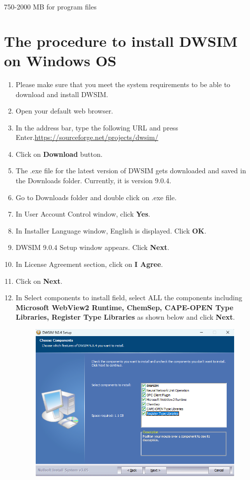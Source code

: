 \documentclass[a4paper,12pt]{article}
\begin{document}
750-2000 MB for program files

\section{The procedure to install DWSIM on Windows OS}

\begin{enumerate}
\item Please make sure that you meet the system requirements to be able to download and install DWSIM.
\item Open your default web browser.
\item In the address bar, type the following URL and press Enter.\newline \url{https://sourceforge.net/projects/dwsim/}
\item Click on \textbf{Download} button.
\item The .exe file for the latest version of DWSIM gets downloaded and saved in the Downloads folder. Currently, it is version 9.0.4.
\item Go to Downloads folder and double click on .exe file.
\item In User Account Control window, click \textbf{Yes}.
\item In Installer Language window, English is displayed. Click \textbf{OK}.
\item DWSIM 9.0.4 Setup window appears. Click \textbf{Next}.
\item In License Agreement section, click on \textbf{I Agree}.
\item Click on \textbf{Next}.
\item In Select components to install field, select ALL the components including \textbf{Microsoft WebView2 Runtime, ChemSep, CAPE-OPEN Type Libraries, Register Type Libraries} as shown below and click \textbf{Next}.
\begin{figure}[H]
	\centering
	\includegraphics[width=0.7\linewidth]{DWSIM-Components.png}

\end{figure}
\end{enumerate}
\end{document}
